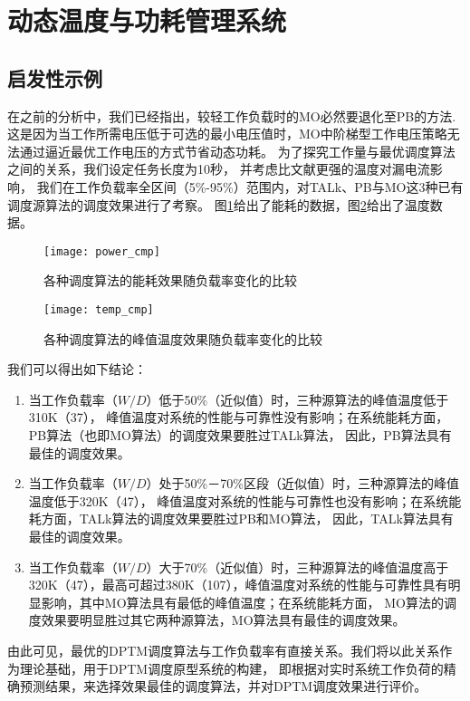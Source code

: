 \section{动态温度与功耗管理系统}
\label{DPTM-system}
\subsection{启发性示例}
在之前的分析中，我们已经指出，较轻工作负载时的MO必然要退化至PB的方法. 这是因为当工作所需电压低于可选的最小电压值时，MO中阶梯型工作电压策略无法通过逼近最优工作电压的方式节省动态功耗。 为了探究工作量与最优调度算法之间的关系，我们设定任务长度为10秒， 并考虑比文献更强的温度对漏电流影响， 我们在工作负载率全区间（5\%-95\%）范围内，对TALk、PB与MO这3种已有调度源算法的调度效果进行了考察。 图\ref{fig:exp-power-cmp}给出了能耗的数据，图\ref{fig:exp-temp-cmp}给出了温度数据。
\begin{figure}%
  \centering
  \texttt{[image: power\_cmp]}
  \caption{各种调度算法的能耗效果随负载率变化的比较}
  \label{fig:exp-power-cmp}
\end{figure}
\begin{figure}%
  \centering
  \texttt{[image: temp\_cmp]}
  \caption{各种调度算法的峰值温度效果随负载率变化的比较}
  \label{fig:exp-temp-cmp}
\end{figure}

我们可以得出如下结论：
\begin{enumerate}[1)]
\item 当工作负载率（$W/D$）低于50\%（近似值）时，三种源算法的峰值温度低于310K（37\celsius）， 峰值温度对系统的性能与可靠性没有影响；在系统能耗方面，PB算法（也即MO算法）的调度效果要胜过TALk算法， 因此，PB算法具有最佳的调度效果。
\item 当工作负载率（$W/D$）处于50\%－70\%区段（近似值）时，三种源算法的峰值温度低于320K（47\celsius）， 峰值温度对系统的性能与可靠性也没有影响；在系统能耗方面，TALk算法的调度效果要胜过PB和MO算法， 因此，TALk算法具有最佳的调度效果。
\item 当工作负载率（$W/D$）大于70\%（近似值）时，三种源算法的峰值温度高于320K（47\celsius ），最高可超过380K（107\celsius ），峰值温度对系统的性能与可靠性具有明显影响，其中MO算法具有最低的峰值温度；在系统能耗方面， MO算法的调度效果要明显胜过其它两种源算法，MO算法具有最佳的调度效果。
\end{enumerate}

由此可见，最优的DPTM调度算法与工作负载率有直接关系。我们将以此关系作为理论基础，用于DPTM调度原型系统的构建， 即根据对实时系统工作负荷的精确预测结果，来选择效果最佳的调度算法，并对DPTM调度效果进行评价。

